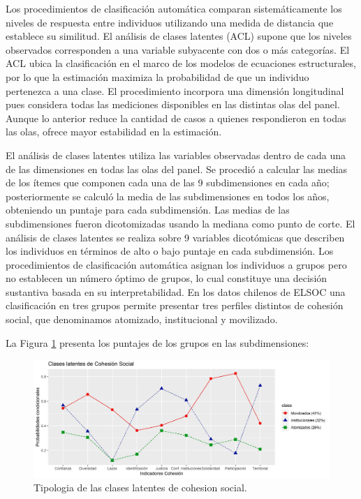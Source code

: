 \documentclass[
  12pt,
]{book}
\begin{document}
Los procedimientos de clasificación automática comparan sistemáticamente los niveles de respuesta entre individuos utilizando una medida de distancia que establece su similitud. El análisis de clases latentes (ACL) supone que los niveles observados corresponden a una variable subyacente con dos o más categorías. El ACL ubica la clasificación en el marco de los modelos de ecuaciones estructurales, por lo que la estimación maximiza la probabilidad de que un individuo pertenezca a una clase. El procedimiento incorpora una dimensión longitudinal pues considera todas las mediciones disponibles en las distintas olas del panel. Aunque lo anterior reduce la cantidad de casos a quienes respondieron en todas las olas, ofrece mayor estabilidad en la estimación.

El análisis de clases latentes utiliza las variables observadas dentro de cada una de las dimensiones en todas las olas del panel. Se procedió a calcular las medias de los ítemes que componen cada una de las 9 subdimensiones en cada año; posteriormente se calculó la media de las subdimensiones en todos los años, obteniendo un puntaje para cada subdimensión. Las medias de las subdimensiones fueron dicotomizadas usando la mediana como punto de corte. El análisis de clases latentes se realiza sobre 9 variables dicotómicas que describen los individuos en términos de alto o bajo puntaje en cada subdimensión. Los procedimientos de clasificación automática asignan los individuos a grupos pero no establecen un número óptimo de grupos, lo cual constituye una decisión sustantiva basada en su interpretabilidad. En los datos chilenos de ELSOC una clasificación en tres grupos permite presentar tres perfiles distintos de cohesión social, que denominamos atomizado, institucional y movilizado.

La Figura \ref{fig:clases-latentes} presenta los puntajes de los grupos en las subdimensiones:

\begin{figure}[H]

{\centering \includegraphics[width=1\linewidth,height=1\textheight]{output/graphs/lca3} 

}

\caption{Tipologia de las clases latentes de cohesion social.}\label{fig:clases-latentes}
\end{figure}
\end{document}
